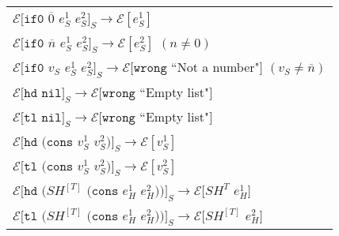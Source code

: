 \begin{figure}[p]
\begin{tabular}{l}
\vspace{5pt}

$\mathscr{E}[\mathtt{if0}$ $\overline{0}$ $e_{S}^{1}$ $e_{S}^{2}]_{S}\rightarrow\mathscr{E}[e_{S}^{1}]$ \\

\vspace{5pt}

$\mathscr{E}[\mathtt{if0}$ $\overline{n}$ $e_{S}^{1}$ $e_{S}^{2}]_{S}\rightarrow\mathscr{E}[e_{S}^{2}]$ $(n\neq 0)$ \\

\vspace{5pt}

$\mathscr{E}[\mathtt{if0}$ $v_{S}$ $e_{S}^{1}$ $e_{S}^{2}]_{S}\rightarrow\mathscr{E}[\mathtt{wrong}$ ``Not a number"$]$ $(v_{S}\neq\overline{n})$ \\

\vspace{5pt}

$\mathscr{E}[\mathtt{hd}$ $\mathtt{nil}]_{S}\rightarrow\mathscr{E}[\mathtt{wrong}$ ``Empty list"$]$ \\

\vspace{5pt}

$\mathscr{E}[\mathtt{tl}$ $\mathtt{nil}]_{S}\rightarrow\mathscr{E}[\mathtt{wrong}$ ``Empty list"$]$ \\

\vspace{5pt}

$\mathscr{E}[\mathtt{hd}$ $(\mathtt{cons}$ $v_{S}^{1}$ $v_{S}^{2})]_{S}\rightarrow\mathscr{E}[v_{S}^{1}]$ \\

\vspace{5pt}

$\mathscr{E}[\mathtt{tl}$ $(\mathtt{cons}$ $v_{S}^{1}$ $v_{S}^{2})]_{S}\rightarrow\mathscr{E}[v_{S}^{2}]$ \\

\vspace{5pt}

$\mathscr{E}[\mathtt{hd}$ $(SH^{[T]}$ $(\mathtt{cons}$ $e_{H}^{1}$ $e_{H}^{2}))]_{S}\rightarrow\mathscr{E}[SH^{T}$ $e_{H}^{1}]$ \\

\vspace{5pt}

$\mathscr{E}[\mathtt{tl}$ $(SH^{[T]}$ $(\mathtt{cons}$ $e_{H}^{1}$ $e_{H}^{2}))]_{S}\rightarrow\mathscr{E}[SH^{[T]}$ $e_{H}^{2}]$ \\


\end{tabular}
\end{figure}
